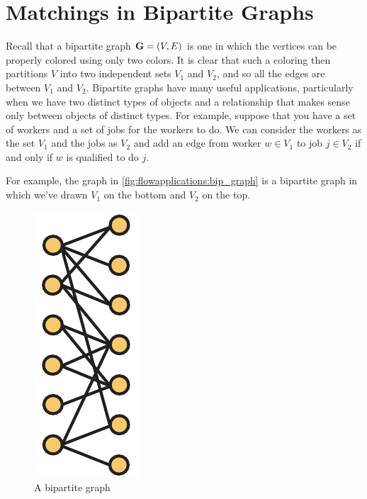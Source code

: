 \section{Matchings in Bipartite Graphs}

Recall that a bipartite graph $\mathbf{G}=(V,E)$ is one in which the vertices can
be properly colored using only two colors. It is clear that such a
coloring then partitions $V$ into two independent sets $V_1$ and
$V_2$, and so all the edges are between $V_1$ and $V_2$. Bipartite
graphs have many useful applications, particularly when we have two
distinct types of objects and a relationship that makes sense only
between objects of distinct types. For example, suppose that you have
a set of workers and a set of jobs for the workers to do. We can
consider the workers as the set $V_1$ and the jobs as $V_2$ and add an
edge from worker $w\in V_1$ to job $j\in V_2$ if and only if $w$ is
qualified to do $j$. 

For example, the graph in \autoref{fig:flowapplications:bip_graph} is
a bipartite graph in which we've drawn $V_1$ on the bottom and $V_2$
on the top.

\begin{figure}[h]
  \centering
  \includegraphics[scale=0.65,angle=90]{flowapplications-figs/bipartite_graph}
  \caption{A bipartite graph}
  \label{fig:flowapplications:bip_graph}
\end{figure}

